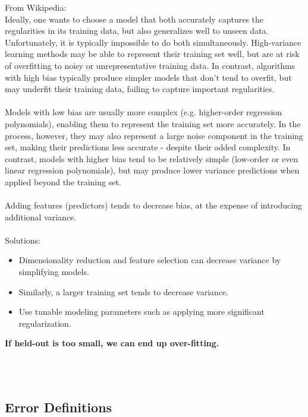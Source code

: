 From Wikipedia: \hfill \\  %
Ideally, one wants to choose a model that both accurately captures the regularities in its training data, 
but also generalizes well to unseen data. Unfortunately, it is typically impossible to do both simultaneously. 
High-variance learning methods may be able to represent their training set well, but are at risk of overfitting 
to noisy or unrepresentative training data. 
In contrast, algorithms with high bias typically produce simpler models that don't tend to overfit, 
but may underfit their training data, failing to capture important regularities. \hfill \\  \hfill \\

Models with low bias are usually more complex (e.g. higher-order regression polynomials), 
enabling them to represent the training set more accurately. 
In the process, however, they may also represent a large noise component in the training set, 
making their predictions less accurate - despite their added complexity. 
In contrast, models with higher bias tend to be relatively simple (low-order or even linear regression polynomials), 
but may produce lower variance predictions when applied beyond the training set. \hfill \\ \hfill \\

Adding features (predictors) tends to decrease bias, at the expense of introducing additional variance.   \hfill \\
\hfill \\

Solutions:
\begin{itemize}
	\item Dimensionality reduction and feature selection can decrease variance by simplifying models. 
	\item Similarly, a larger training set tends to decrease variance. 
	\item Use tunable modeling parameters such as applying more significant regularization.
\end{itemize}

\textbf{If held-out is too small, we can end up over-fitting.}


\hfill \\  \hfill \\

\subsection{Error Definitions}

